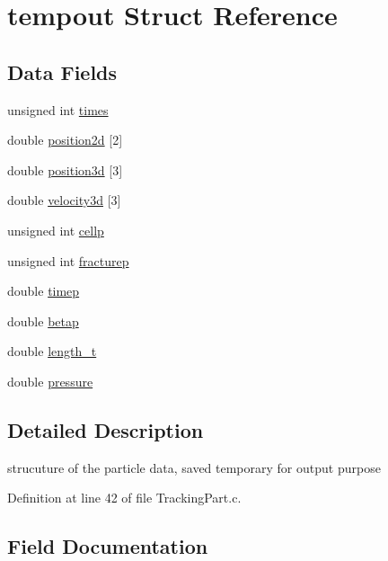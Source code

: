 \hypertarget{structtempout}{}\section{tempout Struct Reference}
\label{structtempout}
\subsection*{Data Fields}
\begin{DoxyCompactItemize}
\item 
unsigned int \mbox{\hyperlink{structtempout_a7f6e4c17b4f10a6d9bbdbf02f794217f}{times}}
\item 
double \mbox{\hyperlink{structtempout_a766494dc449f55f34cbb0404c0b3823a}{position2d}} \mbox{[}2\mbox{]}
\item 
double \mbox{\hyperlink{structtempout_a389fe2c017890281652d5abc6a608f91}{position3d}} \mbox{[}3\mbox{]}
\item 
double \mbox{\hyperlink{structtempout_abc348407152ab976840ee50d46164a83}{velocity3d}} \mbox{[}3\mbox{]}
\item 
unsigned int \mbox{\hyperlink{structtempout_a959460ad7a7becc867670385c6540dcd}{cellp}}
\item 
unsigned int \mbox{\hyperlink{structtempout_aae2e06cd449b82338982dfcbeaacfe13}{fracturep}}
\item 
double \mbox{\hyperlink{structtempout_af198ba0015680ea5c222caca83cc4d7a}{timep}}
\item 
double \mbox{\hyperlink{structtempout_aaadaf59e6458b77cd74d6e42b7f946bf}{betap}}
\item 
double \mbox{\hyperlink{structtempout_a56ef223d6bce6cfa895728b327d2bd82}{length\+\_\+t}}
\item 
double \mbox{\hyperlink{structtempout_aac9d83b4e041609a40d2f5c2cf1d1bb5}{pressure}}
\end{DoxyCompactItemize}


\subsection{Detailed Description}
strucuture of the particle data, saved temporary for output purpose 

Definition at line 42 of file Tracking\+Part.\+c.



\subsection{Field Documentation}
\mbox{\label{structtempout_aaadaf59e6458b77cd74d6e42b7f946bf}} 

